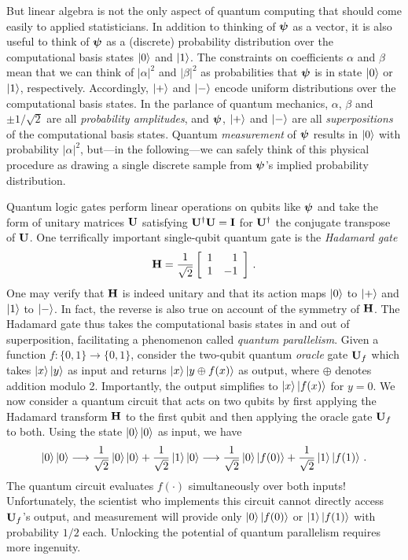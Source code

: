 \documentclass[12pt]{article} %
\begin{document}
But linear algebra is not the only aspect of quantum computing that should come easily to applied statisticians. In addition to thinking of $\boldsymbol{\psi}$ as a vector, it is also useful to think of $\boldsymbol{\psi}$ as a (discrete) probability distribution over the computational basis states $\ket{0}$ and $\ket{1}$. The constraints on coefficients $\alpha$ and $\beta$ mean that we can think of $|\alpha|^2$ and $|\beta|^2$ as probabilities that $\boldsymbol{\psi}$ is in state $\ket{0}$ or $\ket{1}$, respectively.  Accordingly, $\ket{+}$ and $\ket{-}$ encode uniform distributions over the computational basis states.  In the parlance of quantum mechanics, $\alpha$, $\beta$ and $\pm1/\sqrt{2}$ are all \emph{probability amplitudes}, and $\boldsymbol{\psi}$, $\ket{+}$ and $\ket{-}$ are all \emph{superpositions} of the computational basis states. Quantum \emph{measurement} of $\boldsymbol{\psi}$ results in $\ket{0}$ with probability $|\alpha|^2$, but---in the following---we can safely think of this physical procedure as drawing a single discrete sample from $\boldsymbol{\psi}$'s implied probability distribution.

Quantum logic gates perform linear operations on qubits like $\boldsymbol{\psi}$ and take the form of unitary matrices $\mathbf{U}$ satisfying $\mathbf{U}^\dagger \mathbf{U}=\mathbf{I}$ for $\mathbf{U}^\dagger$ the conjugate transpose of $\mathbf{U}$. One terrifically important single-qubit quantum gate is the \emph{Hadamard gate}
\begin{align*}
\mathbf{H} = \frac{1}{\sqrt{2}} \left[\begin{array}{rr}
1 & 1 \\
1 & -1 \end{array}\right] \, .
\end{align*}
One may verify that $\mathbf{H}$ is indeed unitary and that its action maps $\ket{0}$ to $\ket{+}$ and $\ket{1}$ to $\ket{-}$.  In fact, the reverse is also true on account of the symmetry of $\mathbf{H}$.  The Hadamard gate thus takes the computational basis states in and out of superposition, facilitating a phenomenon called \emph{quantum parallelism}. Given a function $f: \{0,1\} \rightarrow \{0,1\}$, consider the two-qubit quantum \emph{oracle} gate $\mathbf{U}_f$ which takes $\ket{x}\ket{y}$ as input and returns $\ket{x}\ket{y\oplus f(x)}$ as output, where $\oplus$ denotes addition modulo 2.  Importantly, the output simplifies to $\ket{x}\ket{f(x)}$ for $y=0$. We now consider a quantum circuit that acts on two qubits by first applying the Hadamard transform $\mathbf{H}$ to the first qubit and then applying the oracle gate $\mathbf{U}_f$ to both. Using the state $\ket{0}\ket{0}$ as input, we have
\begin{align}\label{eq:quantparallel}
\ket{0}\ket{0} \longrightarrow \frac{1}{\sqrt{2}} \ket{0}\ket{0} + \frac{1}{\sqrt{2}} \ket{1}\ket{0}  \longrightarrow \frac{1}{\sqrt{2}} \ket{0}\ket{f(0)} + \frac{1}{\sqrt{2}} \ket{1}\ket{f(1)} \, .
\end{align}
The quantum circuit evaluates $f(\cdot)$ simultaneously over both inputs!  Unfortunately, the scientist who implements this circuit cannot directly access $\mathbf{U}_f$'s output, and measurement will provide only $\ket{0}\ket{f(0)}$ or $\ket{1}\ket{f(1)}$ with probability $1/2$ each.  Unlocking the potential of quantum parallelism requires more ingenuity.
\end{document}
